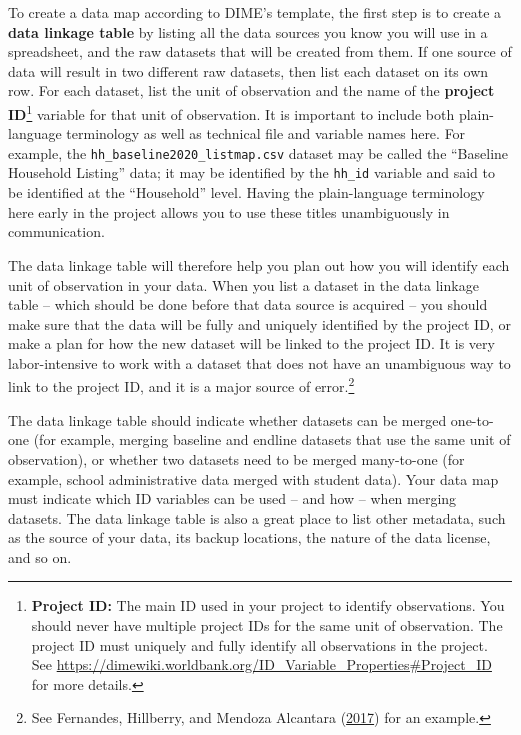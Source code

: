\documentclass[
]{book}
\begin{document}
To create a data map according to DIME's template,
the first step is to create a \textbf{data linkage table} by listing
all the data sources you know you will use in a spreadsheet,
and the raw datasets that will be created from them.
If one source of data will result in two different raw datasets,
then list each dataset on its own row.
For each dataset, list the unit of observation
and the name of the \textbf{project ID}\footnote{\textbf{Project ID:} The main ID used in your project to identify
  observations.
  You should never have multiple project IDs for the same unit of observation.
  The project ID must uniquely and fully identify all observations in the project.
  See \url{https://dimewiki.worldbank.org/ID_Variable_Properties\#Project_ID} for more details.}
variable for that unit of observation.
It is important to include both plain-language terminology
as well as technical file and variable names here.
For example, the \texttt{hh\_baseline2020\_listmap.csv} dataset
may be called the ``Baseline Household Listing'' data;
it may be identified by the \texttt{hh\_id} variable
and said to be identified at the ``Household'' level.
Having the plain-language terminology here early in the project
allows you to use these titles unambiguously in communication.

The data linkage table will therefore help you plan out
how you will identify each unit of observation in your data.
When you list a dataset in the data linkage table --
which should be done before that data source is acquired --
you should make sure that the data will
be fully and uniquely identified by the project ID,
or make a plan for how the new dataset will be linked to the project ID.
It is very labor-intensive to work with a dataset that
does not have an unambiguous way to link to the project ID,
and it is a major source of error.\footnote{See Fernandes, Hillberry, and Mendoza Alcantara (\protect\hyperlink{ref-fernandes2017evaluation}{2017}) for an example.}

The data linkage table should indicate whether
datasets can be merged one-to-one (for example,
merging baseline and endline datasets
that use the same unit of observation),
or whether two datasets need to be merged many-to-one
(for example, school administrative data merged with student data).
Your data map must indicate which ID variables
can be used -- and how -- when merging datasets.
The data linkage table is also a great place to list other metadata,
such as the source of your data, its backup locations,
the nature of the data license, and so on.
\end{document}
